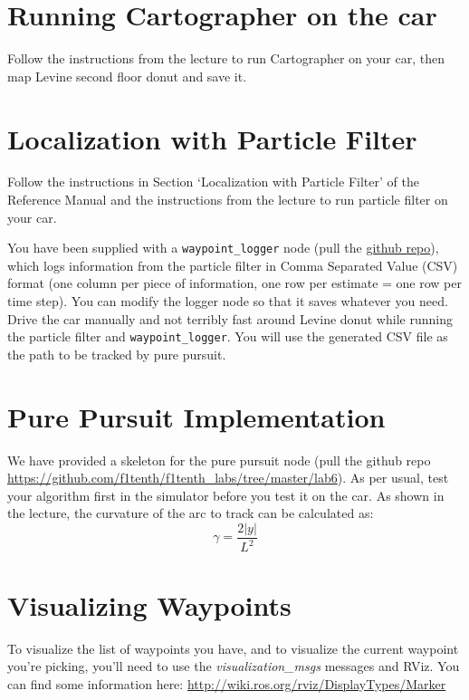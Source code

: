 \documentclass[letta4 paper]{article}
\numberwithin{equation}{section}
\newcommand{\0}{\mathbf{0}}
\begin{document}
	\section{Running Cartographer on the car}
	Follow the instructions from the lecture to run Cartographer on your car, then map Levine second floor donut and save it.
	
	
	\section{Localization with Particle Filter}
	Follow the instructions in Section `Localization with Particle Filter' of the Reference Manual and the instructions from the lecture to run particle filter on your car.
	
	
	\noindent You have been supplied with a \texttt{waypoint\_logger} node (pull the \href{https://github.com/f1tenth/f1tenth_labs/tree/master/waypoint_logger}{github repo}), which logs information from the particle filter in Comma Separated Value (CSV) format (one column per piece of information, one row per estimate = one row per time step). You can modify the logger node so that it saves whatever you need. Drive the car manually and not terribly fast around Levine donut while running the particle filter and \texttt{waypoint\_logger}. You will use the generated CSV file as the path to be tracked by pure pursuit.
	
	
	\section{Pure Pursuit Implementation}
	We have provided a skeleton for the pure pursuit node (pull the github repo \url{https://github.com/f1tenth/f1tenth_labs/tree/master/lab6}). As per usual, test your algorithm first in the simulator before you test it on the car. As shown in the lecture, the curvature of the arc to track can be calculated as:
	\begin{equation}
	\gamma = \frac{2|y|}{L^2}
	\end{equation}
	
	
	\section{Visualizing Waypoints}
	To visualize the list of waypoints you have, and to visualize the current waypoint you're picking, you'll need to use the \textit{visualization\_msgs} messages and RViz. You can find some information here: \href{http://wiki.ros.org/rviz/DisplayTypes/Marker}{http://wiki.ros.org/rviz/DisplayTypes/Marker}
	
\end{document}
